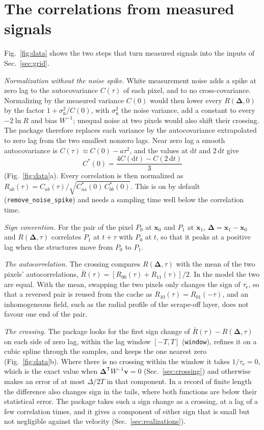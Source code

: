 \documentclass[aps,pre,11pt,a4paper,preprint,amsmath,amssymb,groupedaddress]{revtex4-2}
\newcommand{\Figref}[1]{Fig.~\ref{#1}}
\newcommand{\Secref}[1]{Sec.~\ref{#1}}
\newcommand{\rmd}{\text{d}}
\newcommand{\br}{\ensuremath{\bm{x}}}
\newcommand{\bv}{\ensuremath{\bm{v}}}
\newcommand{\bD}{\ensuremath{\bm{\Delta}}}
\newcommand{\T}{\ensuremath{\mathsf{T}}}
\newcommand{\taue}{\ensuremath{\tau_\text{e}}}
\newcommand{\Wi}{\ensuremath{W^{-1}}}
\newcommand{\tlag}{\tau}
\newcommand{\code}[1]{\texttt{#1}}
\begin{document}
\section{The correlations from measured signals}
\label{sec:data}

\Figref{fig:data} shows the two steps that turn measured signals into the inputs of \Secref{sec:grid}.

\emph{Normalization without the noise spike.} White measurement noise adds a spike at zero lag to the autocovariance $C(\tlag)$ of each pixel, and to no cross-covariance. Normalizing by the measured variance $C(0)$ would then lower every $R(\bD,0)$ by the factor $1 + \sigma_\text{n}^2/C(0)$, with $\sigma_\text{n}^2$ the noise variance, add a constant to every $-2\ln R$ and bias \Wi; unequal noise at two pixels would also shift their crossing. The package therefore replaces each variance by the autocovariance extrapolated to zero lag from the two smallest nonzero lags. Near zero lag a smooth autocovariance is $C(\tlag) \approx C(0) - a\tlag^2$, and the values at $\rmd t$ and $2\,\rmd t$ give
%
\begin{equation}
\label{eq:spike_free}
C^*(0) = \frac{4C(\rmd t) - C(2\,\rmd t)}{3}
\end{equation}
%
(\Figref{fig:data}a). Every correlation is then normalized as $R_{ab}(\tlag) = C_{ab}(\tlag)/\sqrt{C^*_{aa}(0)\,C^*_{bb}(0)}$. This is on by default (\code{remove\_noise\_spike}) and needs a sampling time well below the correlation time.

\emph{Sign convention.} For the pair of the pixel $P_0$ at $\br_0$ and $P_1$ at $\br_1$, $\bD = \br_1 - \br_0$ and $R(\bD,\tlag)$ correlates $P_1$ at $t + \tlag$ with $P_0$ at $t$, so that it peaks at a positive lag when the structures move from $P_0$ to $P_1$.

\emph{The autocorrelation.} The crossing compares $R(\bD,\tlag)$ with the mean of the two pixels' autocorrelations, $\bar{R}(\tlag) = [R_{00}(\tlag) + R_{11}(\tlag)]/2$. In the model the two are equal. With the mean, swapping the two pixels only changes the sign of \taue, so that a reversed pair is reused from the cache as $R_{10}(\tlag) = R_{01}(-\tlag)$, and an inhomogeneous field, such as the radial profile of the scrape-off layer, does not favour one end of the pair.

\emph{The crossing.} The package looks for the first sign change of $\bar{R}(\tlag) - R(\bD,\tlag)$ on each side of zero lag, within the lag window $[-T, T]$ (\code{window}), refines it on a cubic spline through the samples, and keeps the one nearest zero (\Figref{fig:data}b). Where there is no crossing within the window it takes $1/\taue = 0$, which is the exact value when $\bD^\T\Wi\bv = 0$ (\Secref{sec:crossing}) and otherwise makes an error of at most $\Delta/2T$ in that component. In a record of finite length the difference also changes sign in the tails, where both functions are below their statistical error. The package takes such a sign change as a crossing, at a lag of a few correlation times, and it gives a component of either sign that is small but not negligible against the velocity (\Secref{sec:realizations}).
\end{document}
